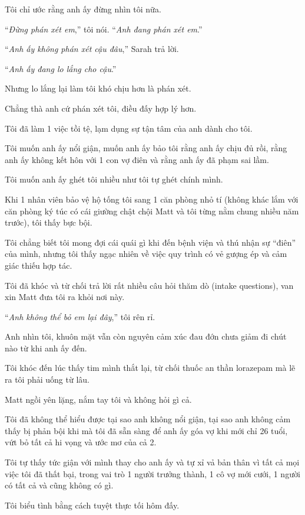 \documentclass{article}
\begin{document}
Tôi chỉ ước rằng anh ấy đừng nhìn tôi nữa.

%
``\textit{Đừng phán xét em},'' tôi nói. ``\textit{Anh đang phán xét em}.''

%
``\textit{Anh ấy không phán xét cậu đâu},'' Sarah trả lời.

``\textit{Anh ấy đang lo lắng cho cậu}.''

%
Nhưng lo lắng lại làm tôi khó chịu hơn là phán xét.

Chẳng thà anh cứ phán xét tôi, điều đấy hợp lý hơn.

Tôi đã làm 1 việc tồi tệ, lạm dụng sự tận tâm của anh dành cho tôi.

Tôi muốn anh ấy nổi giận, muốn anh ấy bảo tôi rằng anh ấy chịu đủ rồi, rằng anh ấy không kết hôn với 1 con vợ điên và rằng anh ấy đã phạm sai lầm.

Tôi muốn anh ấy ghét tôi nhiều như tôi tự ghét chính mình.

%
Khi 1 nhân viên bảo vệ hộ tống tôi sang 1 căn phòng nhỏ tí (không khác lắm với căn phòng ký túc có cái giường chật chội Matt và tôi từng nằm chung nhiều năm trước), tôi thấy bực bội.

Tôi chẳng biết tôi mong đợi cái quái gì khi đến bệnh viện và thú nhận sự ``điên'' của mình, nhưng tôi thấy ngạc nhiên về việc quy trình có vẻ gượng ép và cảm giác thiếu hợp tác.

Tôi đã khóc và từ chối trả lời rất nhiều câu hỏi thăm dò (intake questions), van xin Matt đưa tôi ra khỏi nơi này.

%
``\textit{Anh không thể bỏ em lại đây},'' tôi rên rỉ.

%
Anh nhìn tôi, khuôn mặt vẫn còn nguyên cảm xúc đau đớn chưa giảm đi chút nào từ khi anh ấy đến.

%
Tôi khóc đến lúc thấy tim mình thắt lại, từ chối thuốc an thần lorazepam mà lẽ ra tôi phải uống từ lâu.

Matt ngồi yên lặng, nắm tay tôi và không hỏi gì cả.

%
Tôi đã không thể hiểu được tại sao anh không nổi giận, tại sao anh không cảm thấy bị phản bội khi mà tôi đã sẵn sàng để anh ấy góa vợ khi mới chỉ 26 tuổi, vứt bỏ tất cả hi vọng và ước mơ của cả 2.

Tôi tự thấy tức giận với mình thay cho anh ấy và tự xỉ vả bản thân vì tất cả mọi việc tôi đã thất bại, trong vai trò 1 người trưởng thành, 1 cô vợ mới cưới, 1 người có tất cả và cũng không có gì.

Tôi biểu tình bằng cách tuyệt thực tối hôm đấy.
\end{document}
